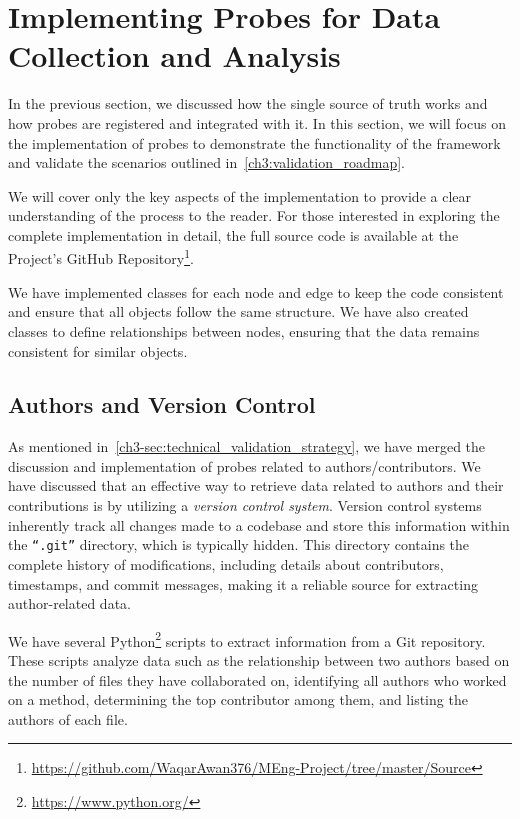 \section{Implementing Probes for Data Collection and Analysis}\label{sec:probes_implementation}

In the previous section, we discussed how the single source of truth works and how probes are registered and integrated with it. In this section, we will focus on the implementation of probes to demonstrate the functionality of the framework and validate the scenarios outlined in~\autoref{ch3:validation_roadmap}.  

We will cover only the key aspects of the implementation to provide a clear understanding of the process to the reader. For those interested in exploring the complete implementation in detail, the full source code is available at the Project's GitHub Repository\footnote{\url{https://github.com/WaqarAwan376/MEng-Project/tree/master/Source}}.

We have implemented classes for each node and edge to keep the code consistent and ensure that all objects follow the same structure. We have also created classes to define relationships between nodes, ensuring that the data remains consistent for similar objects.

\subsection{Authors and Version Control}

As mentioned in~\autoref{ch3-sec:technical_validation_strategy}, we have merged the discussion and implementation of probes related to authors/contributors. We have discussed that an effective way to retrieve data related to authors and their contributions is by utilizing a \textit{version control system}. Version control systems inherently track all changes made to a codebase and store this information within the \texttt{``.git''} directory, which is typically hidden. This directory contains the complete history of modifications, including details about contributors, timestamps, and commit messages, making it a reliable source for extracting author-related data.

We have several Python\footnote{\url{https://www.python.org/}} scripts to extract information from a Git repository. These scripts analyze data such as the relationship between two authors based on the number of files they have collaborated on, identifying all authors who worked on a method, determining the top contributor among them, and listing the authors of each file.

